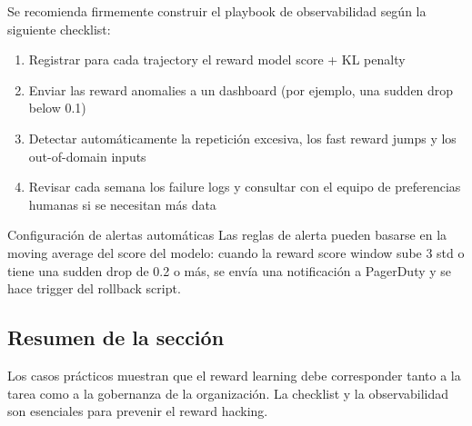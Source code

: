Se recomienda firmemente construir el playbook de observabilidad según la siguiente checklist:

\begin{enumerate}
    \item Registrar para cada trajectory el reward model score + KL penalty
    \item Enviar las reward anomalies a un dashboard (por ejemplo, una sudden drop below 0.1)
    \item Detectar automáticamente la repetición excesiva, los fast reward jumps y los out-of-domain inputs
    \item Revisar cada semana los failure logs y consultar con el equipo de preferencias humanas si se necesitan más data
\end{enumerate}

\begin{importantbox}{Configuración de alertas automáticas}
Las reglas de alerta pueden basarse en la moving average del score del modelo: cuando la reward score window sube 3 std o tiene una sudden drop de 0.2 o más, se envía una notificación a PagerDuty y se hace trigger del rollback script.
\end{importantbox}

\subsection{Resumen de la sección}

Los casos prácticos muestran que el reward learning debe corresponder tanto a la tarea como a la gobernanza de la organización. La checklist y la observabilidad son esenciales para prevenir el reward hacking.
